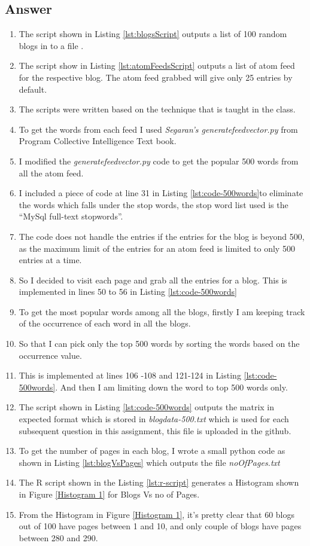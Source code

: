 \subsection{Answer}
\begin{enumerate}
\item The script shown in Listing \ref{lst:blogsScript} outputs a list of 100 random blogs in to a file . 
\item The script show in Listing \ref{lst:atomFeedsScript} outputs a list of atom feed for the respective blog. The atom feed grabbed will give only 25 entries by default.
\item The scripts were written based on the technique that is taught in the class.
\item To get the words from each feed I used \emph{Segaran's generatefeedvector.py} from Program Collective Intelligence Text book. 
\item I modified the \emph{generatefeedvector.py} code to get the popular 500 words from all the atom feed.
\item I included a piece of code at line 31 in Listing \ref{lst:code-500words}to eliminate the words which falls under the stop words, the stop word list used is the ``MySql full-text stopwords''. 
\item The code does not handle the entries if the entries for the blog is beyond 500, as the maximum limit of the entries for an atom feed is limited to only 500 entries at a time. 
\item So I decided to visit each page and grab all the entries for a blog. This is implemented in lines 50 to 56 in Listing \ref{lst:code-500words}
\item To get the most popular words among all the blogs, firstly I am keeping track of the occurrence of each word in all the blogs.
\item So that I can pick only the top 500 words by sorting the words based on the occurrence value. 
\item This is implemented at lines 106 -108 and  121-124 in Listing \ref{lst:code-500words}. And then I am limiting down the word to top 500 words only.
\item The script shown in Listing \ref{lst:code-500words} outputs the matrix in expected format which is stored in \emph{blogdata-500.txt} which is used for each subsequent question in this assignment, this file is uploaded in the github. 
\item To get the number of pages in each blog, I wrote a small python code as shown in Listing \ref{lst:blogVsPages} which outputs the file \emph{noOfPages.txt}
\item The R script shown in the Listing \ref{lst:r-script} generates a Histogram shown in Figure \ref{Histogram 1} for Blogs Vs no of Pages. 
\item From the Histogram in Figure \ref{Histogram 1}, it's pretty clear that 60 blogs out of 100 have pages between 1 and 10, and only couple of blogs have pages between 280 and 290. 
\end{enumerate}

